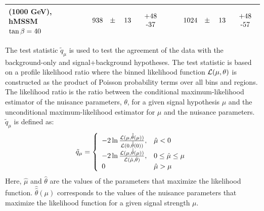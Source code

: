 \begin{table}
\begin{center}
{\begin{tabular}{| l | r | r |}
			\Hpm (1000 GeV), hMSSM $\tan\beta=40$ &   $\phantom{0000}938\phantom{0.}\pm\phantom{00}13\phantom{0.}\phantom{0}\begin{tabular}{c}+48 \\-37\end{tabular}$ & $\phantom{0000}1024\phantom{0.}\pm\phantom{00}13\phantom{0.}\phantom{0}\begin{tabular}{c}+48 \\-57\end{tabular}$ \\
			\hline
			\end{tabular}}
			\end{center}
		\end{table}

		The test statistic $\tilde{q}_{\mu}$ \cite{test-statistic} is used to test the agreement of the data with the background-only and signal+background hypotheses. The test statistic is based on a profile likelihood ratio where the binned likelihood function $\cal{L}(\mu,\theta)$ is constructed as the product of Poisson probability terms over all bins and regions. The likelihood ratio is the ratio between the conditional maximum-likelihood estimator of the nuisance parameters, $\theta$, for a given signal hypothesis $\mu$ and the unconditional maximum-likelihood estimator for $\mu$ and the nuisance parameters. $\tilde{q}_{\mu}$ is defined as:
		\begin{equation}
		\tilde{q}_{\mu} = \left\{
		\begin{array}{ll}
		-2\ln\frac{{\cal L}(\mu, \hat{\hat{\theta}}(\mu))}{{\cal L}(0, \hat{\hat{\theta}}(0))}, & \hat{\mu} < 0 \\
		-2\ln\frac{{\cal L}(\mu, \hat{\hat{\theta}}(\mu))}{{\cal L}(\hat{\mu}, \hat{\theta})}, & 0 \leq \hat{\mu} \leq \mu \\
		0 & \hat{\mu} > \mu 
		\end{array}
		\right.
		\end{equation}
		Here, $\hat{\mu}$ and $\hat{\theta}$ are the values of the parameters that maximize the likelihood function. $\hat{\hat{\theta}}(\mu)$ corresponds to the values of the nuisance parameters that maximize the likelihood function for a given signal strength $\mu$.

